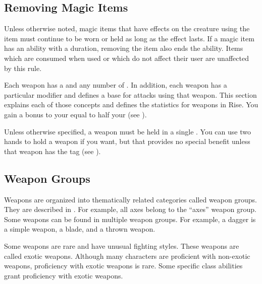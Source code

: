  \subsection{Removing Magic Items}
    Unless otherwise noted, magic items that have effects on the creature using the item must continue to be worn or held as long as the effect lasts.
    If a magic item has an ability with a duration, removing the item also ends the ability.
    Items which are consumed when used or which do not affect their user are unaffected by this rule.

    \newpage
{}

  Each weapon has a  and any number of .
  In addition, each weapon has a particular  modifier and defines a base  for attacks using that weapon.
  This section explains each of those concepts and defines the statistics for weapons in Rise.
  You gain a bonus to your  equal to half your  (see ).

  Unless otherwise specified, a weapon must be held in a single .
  You can use two hands to hold a weapon if you want, but that provides no special benefit unless that weapon has the  tag (see ).

  \subsection{Weapon Groups}\label{Weapon Groups}
    Weapons are organized into thematically related categories called weapon groups. They are described in . For example, all axes belong to the ``axes'' weapon group. Some weapons can be found in multiple weapon groups. For example, a dagger is a simple weapon, a blade, and a thrown weapon.

     Some weapons are rare and have unusual fighting styles.
    These weapons are called exotic weapons.
    Although many characters are proficient with non-exotic weapons, proficiency with exotic weapons is rare.
    Some specific class abilities grant proficiency with exotic weapons.

